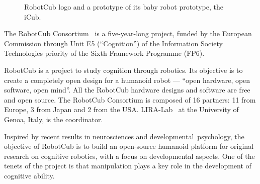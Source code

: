 \begin{figure}
\centering
{} \quad
\caption[RobotCub logo and iCub baby robot prototype]{RobotCub logo and a prototype of its baby robot prototype, the iCub.}
\label{fig:robotcub-icub}
\end{figure}

The \ac{RobotCub} Consortium~\cite{link:robotcub} is a five-year-long project, funded by the European Commission through Unit E5 (``Cognition'') of the Information Society Technologies priority of the Sixth Framework Programme (FP6). 

\ac{RobotCub} is a project to study cognition through robotics. Its objective is to create a completely open design for a humanoid robot --- ``open hardware,
open software, open mind''. All the \ac{RobotCub} hardware designs and software are free and open source. The \ac{RobotCub} Consortium is composed of 16 partners: 11 from Europe, 3 from Japan and 2 from the USA. LIRA-Lab~\cite{link:liralab} at the University of Genoa, Italy, is the coordinator.

Inspired by recent results in neurosciences and developmental~psychology, the objective of \ac{RobotCub} is to build an open-source humanoid platform for original research on cognitive robotics, with a focus on developmental aspects. One of the tenets of the project is that manipulation plays a key role in the development of cognitive ability.

